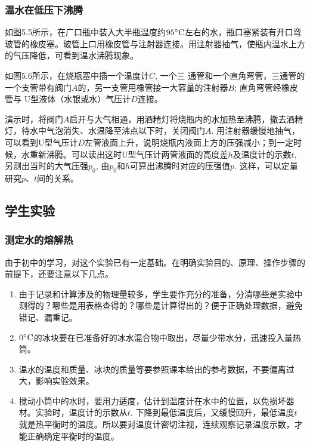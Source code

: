 \subsubsection{温水在低压下沸腾}
如图5.5所示，在广口瓶中装入大半瓶温度约$95^{\circ}{\rm C}$左右的水，瓶口塞紧装有开口弯玻管的橡皮塞。玻管上口用橡皮管与注射器连接。用注射器抽气，使瓶内温水上方的气压降低，可看到温水沸腾现象。
\begin{figure}[htp]\centering
    \begin{minipage}[t]{0.48\textwidth}
    \centering
    \caption{}
    \end{minipage}
    \begin{minipage}[t]{0.48\textwidth}
    \centering
    \caption{}
    \end{minipage}
    \end{figure}

如图5.6所示，在烧瓶塞中插一个温度计$C$, 一个三
通管和一个直角弯管，三通管的一个支管带有阀门$A$的，另一支管用橡管接一大容量的注射器$B$; 直角弯管经橡皮管与
U型液体（水银或水）气压计$D$连接。

演示时，将阀门$A$启开与大气相通，用酒精灯将烧瓶内的水加热至沸腾，撤去酒精灯，待水中气泡消失、水温降至沸点以下时，关闭阀门$A$. 用注射器缓慢地抽气，可以看到U型气压计$D$左管液面上升，说明烧瓶内液面上方的压强减小；到一定时候，水重新沸腾。可以读出这时U型气压计两管液面的高度差$h$及温度计的示数$t$, 另测出当时的大气压强$p_0$, 由$p_0$和$h$可算出沸腾时对应的压强值$p$. 这样，可以定量研究$p$、$t$间的关系。

\subsection{学生实验}
\subsubsection{测定水的熔解热}

由于初中的学习，对这个实验已有一定基础。在明确实验目的、原理、操作步骤的前提下，还要注意以下几点。
\begin{enumerate}
\item 由于记录和计算涉及的物理量较多，学生要作充分的准备，分清哪些是实验中测得的？哪些是用表格查得的？哪些是计算得出的？便于正确处理数据，避免错记、漏重记。
\item $0^{\circ}{\rm C}$的冰块要在已准备好的冰水混合物中取出，尽量少带水分，迅速投入量热筒。
\item 温水的温度和质量、冰块的质量等要参照课本给出的参考数据，不要偏离过大，影响实验效果。
\item 搅动小筒中的水时，要用力适度，估计到温度计在水中的位置，以免损坏器材。实验时，温度计的示数从$t$. 下降到最低温度后，又缓慢回升，最低温度$t$就是热平衡时的温度。所以要对温度计密切注视，连续观察记录温度示数，才能正确确定平衡时的温度。
\end{enumerate}

